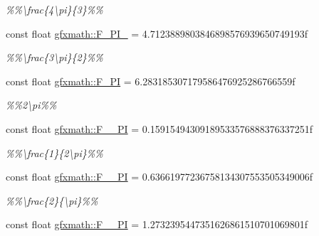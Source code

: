 \begin{DoxyCompactItemize}
\begin{DoxyCompactList}\small\item\em \%\%\textbackslash{}frac\{4\textbackslash{}pi\}\{3\}\%\% \end{DoxyCompactList}\item 
\hypertarget{group___math_consts_ga868af3e091584d5352e3b00e1503a650}{}const float \hyperlink{group___math_consts_ga868af3e091584d5352e3b00e1503a650}{gfxmath\+::\+F\+\_\+P\+I\+\_} = 4.\+7123889803846898576939650749193f\label{group___math_consts_ga868af3e091584d5352e3b00e1503a650}

\begin{DoxyCompactList}\small\item\em \%\%\textbackslash{}frac\{3\textbackslash{}pi\}\{2\}\%\% \end{DoxyCompactList}\item 
\hypertarget{group___math_consts_gac6cbd226e329cad09f1bab1504203fec}{}const float \hyperlink{group___math_consts_gac6cbd226e329cad09f1bab1504203fec}{gfxmath\+::\+F\+\_\+P\+I} = 6.\+283185307179586476925286766559f\label{group___math_consts_gac6cbd226e329cad09f1bab1504203fec}

\begin{DoxyCompactList}\small\item\em \%\%2\textbackslash{}pi\%\% \end{DoxyCompactList}\item 
\hypertarget{group___math_consts_ga325608134effda0b7b34f7088c419db0}{}const float \hyperlink{group___math_consts_ga325608134effda0b7b34f7088c419db0}{gfxmath\+::\+F\+\_\+\_\+P\+I} = 0.\+15915494309189533576888376337251f\label{group___math_consts_ga325608134effda0b7b34f7088c419db0}

\begin{DoxyCompactList}\small\item\em \%\%\textbackslash{}frac\{1\}\{2\textbackslash{}pi\}\%\% \end{DoxyCompactList}\item 
\hypertarget{group___math_consts_ga7d7b856fb17ca616495a547e582ca817}{}const float \hyperlink{group___math_consts_ga7d7b856fb17ca616495a547e582ca817}{gfxmath\+::\+F\+\_\+\_\+\+P\+I} = 0.\+63661977236758134307553505349006f\label{group___math_consts_ga7d7b856fb17ca616495a547e582ca817}

\begin{DoxyCompactList}\small\item\em \%\%\textbackslash{}frac\{2\}\{\textbackslash{}pi\}\%\% \end{DoxyCompactList}\item 
\hypertarget{group___math_consts_ga3cd60bb81423c63766d16736f113da50}{}const float \hyperlink{group___math_consts_ga3cd60bb81423c63766d16736f113da50}{gfxmath\+::\+F\+\_\+\_\+\+P\+I} = 1.\+2732395447351626861510701069801f\label{group___math_consts_ga3cd60bb81423c63766d16736f113da50}


\end{DoxyCompactItemize}
